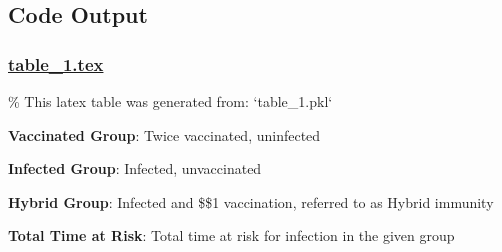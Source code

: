 \documentclass[11pt]{article}
\begin{document}
\subsection{Code Output}

\subsubsection*{\hyperlink{code-LaTeX Table Design-table-1-tex}{table\_1.tex}}

\begin{codeoutput}
\% This latex table was generated from: `table\_1.pkl`
\begin{table}[h]
\caption{Impact of vaccination group on infection event and total time at risk}
\label{table:table1EffectOfVaccinationGroup}
\begin{threeparttable}
\renewcommand{\TPTminimum}{\linewidth}
\begin{tablenotes}
\footnotesize
\item \textbf{Vaccinated Group}: Twice vaccinated, uninfected
\item \textbf{Infected Group}: Infected, unvaccinated
\item \textbf{Hybrid Group}: Infected and \$\geq\$1 vaccination, referred to as Hybrid immunity
\item \textbf{Total Time at Risk}: Total time at risk for infection in the given group
\end{tablenotes}
\end{threeparttable}
\end{table}
\end{codeoutput}
\end{document}
